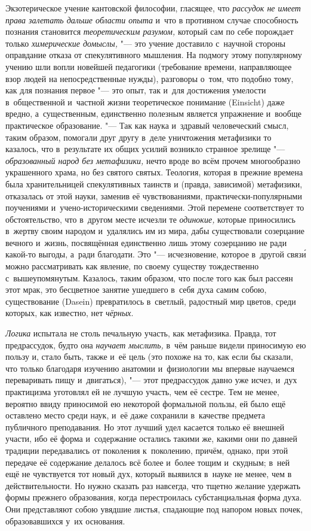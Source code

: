 \label{kantezoter}Экзотерическое учение кантовской философии, гласящее,
что {\em рассудок не имеет права залетать дальше области опыта} и~что в
противном случае способность познания становится {\em теоретическим разумом,}
который сам по себе порождает только {\em химерические домыслы,} "--- это
учение доставило с~научной стороны оправдание отказа от спекулятивного
мышления. На подмогу этому популярному учению шли вопли новейшей педагогики
(требование времени, направляющее взор людей на непосредственные нужды),
разговоры о~том, что подобно тому, как для познания первое "--- это опыт,
так и~для достижения умелости в~общественной и~частной жизни теоретическое
понимание (Einsicht) даже вредно, а~существенным, единственно полезным
является упражнение и~вообще практическое образование. "--- Так как наука и~здравый
человеческий смысл, таким образом, помогали друг другу в~деле уничтожения метафизики
то казалось, что в~результате их общих усилий возникло странное зрелище "---
{\em образованный народ без метафизики,} нечто вроде во всём прочем
многообразно украшенного храма, но без святого святых. Теология, которая в
прежние времена была хранительницей спекулятивных таинств и (правда, зависимой)
метафизики, отказалась от этой науки, заменив её чувствованиями,
практически-популярными поучениями и~учено-историческими сведениями. Этой
перемене соответствует то обстоятельство, что в~другом месте исчезли те
{\em одинокие,} которые приносились в~жертву своим народом и~удалялись им из
мира, дабы существовали созерцание вечного и~жизнь, посвящённая единственно
лишь этому созерцанию не ради какой-то выгоды, а~ради благодати. Это "--- исчезновение,
которое в~другой связ\'{и} можно рассматривать как явление, по
своему существу тождественно с~вышеупомянутым. Казалось, таким образом, что после
того как был рассеян этот мрак, это бесцветное занятие ушедшего в~себя духа самим
собою, существование (Dasein) превратилось в~светлый, радостный мир цветов, среди
которых, как известно, нет {\em чёрных}.

{\em Логика} испытала не столь печальную участь, как метафизика. Правда, тот
предрассудок, будто она {\em научает мыслить,} в~чём раньше видели приносимую
ею пользу и, стало быть, также и~её цель (это похоже на то, как если бы
сказали, что только благодаря изучению анатомии и~физиологии мы впервые
научаемся переваривать пищу и~двигаться), "--- этот предрассудок давно уже
исчез, и~дух практицизма уготовлял ей не лучшую участь, чем её сестре. Тем не
менее, вероятно ввиду приносимой ею некоторой формальной пользы, ей было ещё
оставлено место среди наук, и~её даже сохранили в~качестве предмета публичного
преподавания. Но этот лучший удел касается только её внешней участи, ибо её
форма и~содержание остались такими же, какими они по давней традиции
передавались от поколения к~поколению, причём, однако, при этой передаче
её содержание делалось всё более и~более тощим и~скудным; в~ней ещё не
чувствуется тот новый дух, который выявился в~науке не менее, чем в
действительности. Но нужно сказать раз навсегда, что тщетно желание удержать
формы прежнего образования, когда перестроилась субстанциальная форма духа. Они
представляют собою увядшие листья, спадающие под напором новых почек,
образовавшихся у~их основания.

